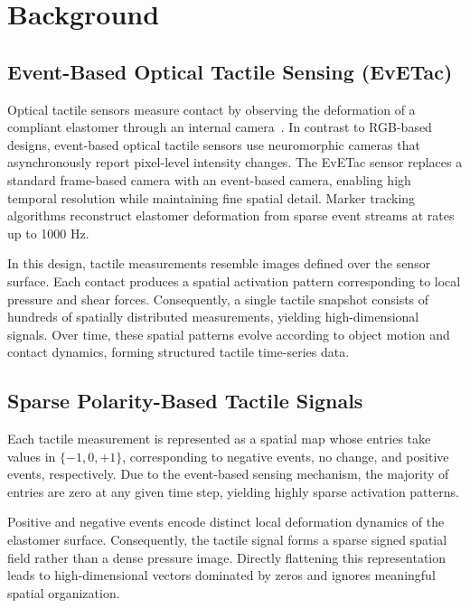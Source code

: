 \documentclass{article}
\begin{document}
    \section{Background}

    \subsection{Event-Based Optical Tactile Sensing (EvETac)}
    
    Optical tactile sensors measure contact by observing the deformation of a compliant elastomer through an internal camera~\cite{Evetac}. In contrast to RGB-based designs, event-based optical tactile sensors use neuromorphic cameras that asynchronously report pixel-level intensity changes. The EvETac sensor replaces a standard frame-based camera with an event-based camera, enabling high temporal resolution while maintaining fine spatial detail. Marker tracking algorithms reconstruct elastomer deformation from sparse event streams at rates up to 1000 Hz.
    
    In this design, tactile measurements resemble images defined over the sensor surface. Each contact produces a spatial activation pattern corresponding to local pressure and shear forces. Consequently, a single tactile snapshot consists of hundreds of spatially distributed measurements, yielding high-dimensional signals. Over time, these spatial patterns evolve according to object motion and contact dynamics, forming structured tactile time-series data.
    
    \subsection{Sparse Polarity-Based Tactile Signals}

    Each tactile measurement is represented as a spatial map whose entries take values in $\{-1, 0, +1\}$, corresponding to negative events, no change, and positive events, respectively. Due to the event-based sensing mechanism, the majority of entries are zero at any given time step, yielding highly sparse activation patterns.
    
    Positive and negative events encode distinct local deformation dynamics of the elastomer surface. Consequently, the tactile signal forms a sparse signed spatial field rather than a dense pressure image. Directly flattening this representation leads to high-dimensional vectors dominated by zeros and ignores meaningful spatial organization.
    
\end{document}
